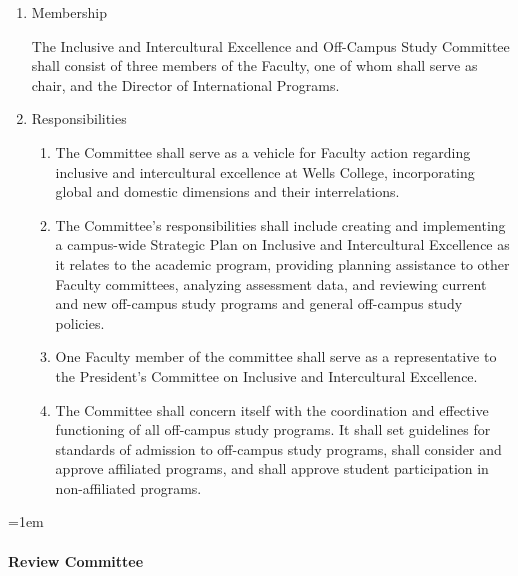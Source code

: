 \documentclass{manual}
\let\oldparagraph\paragraph
\renewcommand\paragraph{\leftskip=1em\oldparagraph}
\newcommand{\itemLevelA}{\alph*.}
\newcommand{\itemLevelB}{\arabic*)}
\newcommand{\itemRefA}{\alph*}
\newcommand{\itemRefB}{\arabic*}
\begin{document}
\begin{enumerate}[label=\itemLevelA,ref=\itemRefA]

\item Membership

The Inclusive and Intercultural Excellence and Off-Campus Study Committee shall consist of three members of the Faculty, one of whom shall serve as chair, and the Director of International Programs.

\item Responsibilities
\begin{enumerate}[label=\itemLevelB,ref=\itemRefB]

\item The Committee shall serve as a vehicle for Faculty action regarding inclusive and intercultural excellence at Wells College, incorporating global and domestic dimensions and their interrelations.

\item The Committee's responsibilities shall include creating and implementing a campus-wide Strategic Plan on Inclusive and Intercultural Excellence as it relates to the academic program, providing planning assistance to other Faculty committees, analyzing assessment data, and reviewing current and new off-campus study programs and general off-campus study policies.

\item One Faculty member of the committee shall serve as a representative to the President's Committee on Inclusive and Intercultural Excellence.

\item The Committee shall concern itself with the coordination and effective functioning of all off-campus study programs. It shall set guidelines for standards of admission to off-campus study programs, shall consider and approve affiliated programs, and shall approve student participation in non-affiliated programs.

\end{enumerate}
\end{enumerate}


\paragraph{Review Committee}\label{par:ReviewCommittee}
\end{document}
